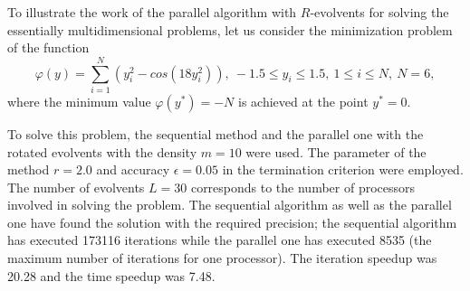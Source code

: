 \begin{example}
\end{example}

\begin{example}
To illustrate the work of the parallel algorithm with $R$-evolvents for solving the essentially multidimensional problems, let us consider the minimization problem of the function
\[
\varphi(y) = \sum_{i=1}^N{\left(y_i^2-cos(18y_i^2)\right)},\ -1.5\leq y_i\leq 1.5, \ 1\leq i\leq N,\ N=6,
\]
where the minimum value $\varphi(y^\ast) = -N$ is achieved at the point $y^*=0$.

To solve this problem, the sequential method and the parallel one with the rotated evolvents with the density $m = 10$ were used. The parameter of the method $r=2.0$ and accuracy $\epsilon = 0.05$ in the termination criterion were employed. The number of evolvents $L = 30$ corresponds to the number of processors involved in solving the problem. The sequential algorithm as well as the parallel one have found the solution with the required precision; the sequential algorithm has executed 173116 iterations while the parallel one has executed 8535 (the maximum number of iterations for one processor). The iteration speedup was 20.28 and the time speedup was 7.48.
\end{example}

